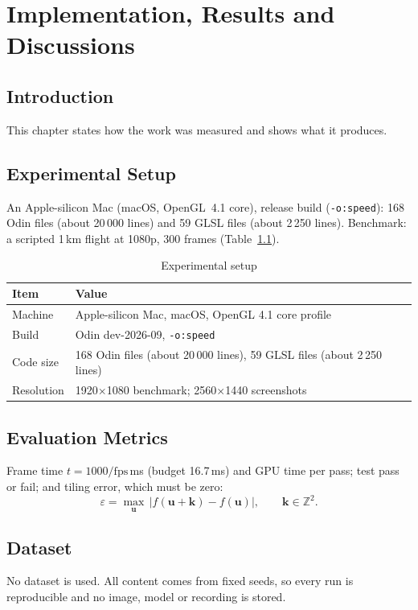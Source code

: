 \documentclass[12pt,a4paper,oneside]{report}
\newcommand{\code}[1]{{\small\texttt{#1}}}
\begin{document}
\chapter{Implementation, Results and Discussions}

\section{Introduction}
This chapter states how the work was measured and shows what it produces.

\section{Experimental Setup}
An Apple-silicon Mac (macOS, OpenGL~4.1 core), release build (\code{-o:speed}): 168 Odin files (about 20\,000 lines) and 59 GLSL files (about 2\,250 lines). Benchmark: a scripted 1\,km flight at 1080p, 300 frames (Table~\ref{tab:setup}).

\begin{table}[H]
	\caption{Experimental setup}\label{tab:setup}
	\small{}
	\begin{tabularx}{\linewidth}{lX}
		\toprule \textbf{Item} & \textbf{Value}\\ \midrule
		Machine & Apple-silicon Mac, macOS, OpenGL 4.1 core profile\\
		Build & Odin dev-2026-09, \code{-o:speed}\\
		Code size & 168 Odin files (about 20\,000 lines), 59 GLSL files (about 2\,250 lines)\\
		Resolution & 1920$\times$1080 benchmark; 2560$\times$1440 screenshots\\
		\bottomrule
	\end{tabularx}
\end{table}

\section{Evaluation Metrics}
Frame time $t=1000/\text{fps}$\,ms (budget 16.7\,ms) and GPU time per pass; test pass or fail; and tiling error, which must be zero:
\begin{equation}\varepsilon=\max_{\mathbf u}\,\left|f(\mathbf u+\mathbf k)-f(\mathbf u)\right|,\qquad \mathbf k\in\mathbb Z^{2}.\end{equation}

\section{Dataset}
No dataset is used. All content comes from fixed seeds, so every run is reproducible and no image, model or recording is stored.
\end{document}
